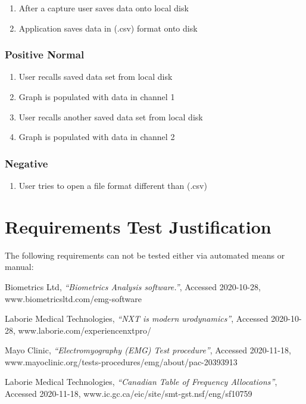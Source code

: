 \documentclass[12pt,a4paper]{article}
\begin{document}
\begin{enumerate}
	\item After a capture user saves data onto local disk
	\item Application saves data in (.csv) format onto disk
\end{enumerate}

\subsubsection{Positive Normal}

\begin{enumerate}
	\item User recalls saved data set from local disk
	\item Graph is populated with data in channel 1
	\item User recalls another saved data set from local disk
	\item Graph is populated with data in channel 2
\end{enumerate}

\subsubsection{Negative}

\begin{enumerate}
	\item User tries to open a file format different than (.csv)  
\end{enumerate}

\newpage

\section{Requirements Test Justification}

The following requirements can not be tested either via automated means or manual:

\newpage
\begin{thebibliography}{9}

  Biometrics Ltd,
  \textit{“Biometrics Analysis software.”},
  Accessed 2020-10-28,
  www.biometricsltd.com/emg-software
  
  Laborie Medical Technologies,
  \textit{“NXT is modern urodynamics”},
  Accessed 2020-10-28,
  www.laborie.com/experiencenxtpro/

  Mayo Clinic,
  \textit{“Electromyography (EMG) Test procedure”},
  Accessed 2020-11-18,
  www.mayoclinic.org/tests-procedures/emg/about/pac-20393913

  Laborie Medical Technologies,
  \textit{“Canadian Table of Frequency Allocations”},
  Accessed 2020-11-18,
  www.ic.gc.ca/eic/site/smt-gst.nsf/eng/sf10759
 
\end{thebibliography}
\end{document}
